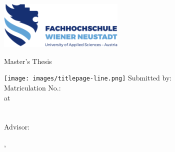 
\makeatletter

\begin{titlepage}

	\includegraphics[width=6cm]{images/fhwn-logo-neu-ohneSchutzraum.png}

	\begin{sffamily}
		\vspace{70pt}
		{\noindent \linespread{1.3} \color{header-blue} \Huge \textbf{\@title} \par }
		\vspace{5pt}
		\begin{center}
			{\noindent\Large Master's Thesis \par}
		\end{center}
		\vspace{5pt}
		\hspace{-35mm}
		\texttt{[image: images/titlepage-line.png]}
		\vspace{15pt}
		\tabto{2cm}Submitted by: \tabto{7cm}\textbf{\@author} \\
		\tabto{2cm}Matriculation No.: \tabto{7cm}\textbf{\matriculationNumber} \\
		\vspace{15pt}
		\tabto{2cm}at \tabto{7cm}\textbf{\study}\\
		\tabto{7cm}\textbf{\studyprogram}\\
		\tabto{7cm}\textbf{\masterdescription}\\
		\vspace{15pt}
		\tabto{2cm}Advisor: \tabto{7cm}\textbf{\advisor}

		\vfill

		\place, \thesisdate
	\end{sffamily}
\end{titlepage}
\makeatother


